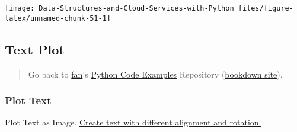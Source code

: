 \documentclass[
]{book}
\begin{document}
\begin{center}\texttt{[image: Data-Structures-and-Cloud-Services-with-Python\_files/figure-latex/unnamed-chunk-51-1]} \end{center}

\hypertarget{text-plot}{%
\subsection{Text Plot}\label{text-plot}}

\begin{quote}
Go back to \href{http://fanwangecon.github.io/}{fan}'s \href{https://fanwangecon.github.io/pyfan/}{Python Code Examples} Repository (\href{https://fanwangecon.github.io/pyfan/bookdown}{bookdown site}).
\end{quote}

\hypertarget{plot-text}{%
\subsubsection{Plot Text}\label{plot-text}}

Plot Text as Image. \href{https://matplotlib.org/3.1.1/gallery/pyplots/text_layout.html\#sphx-glr-gallery-pyplots-text-layout-py}{Create text with different alignment and rotation.}
\end{document}
